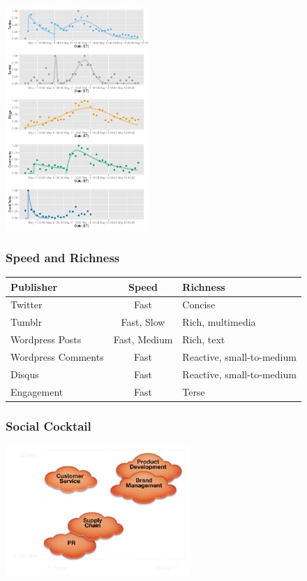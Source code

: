 \documentclass{beamer}
\begin{document}

\begin{frame}
  \begin{center}
    \includegraphics[height=8.5cm]{./imgs/JPMorgan.pdf}
  \end{center}
\end{frame}



\begin{frame} \frametitle{Speed and Richness}
\begin{table}
\begin{tabular}{m{2cm}| c |m{3cm}}
\hline
   {Publisher}   &   {Speed} & {Richness} \\
\hline 
    Twitter       & Fast & Concise  \\ [3pt]
    Tumblr       & Fast, Slow & Rich, multimedia\\  [3pt]
    Wordpress Posts & Fast, Medium &  Rich, text\\  [3pt]
    Wordpress Comments  & Fast & Reactive, small-to-medium\\  [3pt]
    Disqus         & Fast & Reactive, small-to-medium\\  [3pt]
    Engagement   & Fast & Terse\\ 
\hline
\end{tabular}
\end{table}
\end{frame}


\begin{frame}\frametitle{Social Cocktail}
  \begin{center}
    \includegraphics[width=7cm]{./imgs/socialcocktailgrid.png}
  \end{center}
\end{frame}
\end{document}
